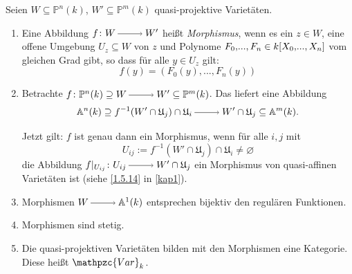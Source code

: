 \documentclass[a4paper,12pt,index=toc]{scrbook}
\theoremstyle{keinenummern} %
\def\A{\mathbb{A}}
\def\P{\mathbb{P}}
\newcommand{\Var}{\mathpzc{Var}}
\def\U{\mathfrak{U}}
\newcommand{\leer}{\ensuremath{\varnothing}}
\newcommand{\restrict}[1]{|_{#1}}
\renewcommand{\dotsc}{\ensuremath{\!...}}
\newcommand{\ppolyx}[1][n]{\ensuremath%
  [X_{0},\dotsc,X_{#1}]}
\begin{document}
\begin{db}\label{2.6.1}
Seien $W\subseteq \P^n(k)$, $W'\subseteq \P^m(k)$ quasi-projektive Varietäten.
  \begin{enumerate}
  \item{} Eine Abbildung $f\colon W\ra W'$ heißt \emph{Morphismus}, wenn es ein $z \in W$, eine offene Umgebung $U_z \subseteq W$ von $z$ und Polynome $F_0,\dotsc,F_n \in k\ppolyx$ vom gleichen Grad gibt, so dass für alle $y \in U_z$ gilt:
\[f(y)=(F_0(y),\dotsc,F_n(y))\]
  \item{} Betrachte $f \colon \P^n(k)\supseteq W \ra W' \subseteq \P^m(k)$. Das liefert eine Abbildung 
  \[\A^n(k)\supseteq f^{-1}(W'\cap \U_j) \cap \U_i \ra W' \cap \U_j\subseteq\A^{m}(k).\] 

Jetzt gilt:
$f$ ist genau dann ein Morphismus, wenn für alle $i,j$ mit 
\[U_{ij}:=f^{-1}(W'\cap \U_j) \cap \U_i \neq \leer\]
 die Abbildung $f\restrict{U_{ij}} \colon U_{ij} \ra W'\cap \U_j$ ein Morphismus von quasi-affinen Varietäten ist (siehe \cref{1.5.14} in \cref{kap1}).
  \item{} Morphismen $W\ra \A^1(k)$ entsprechen bijektiv den regulären Funktionen.
  \item{} Morphismen sind stetig.
  \item{} Die quasi-projektiven Varietäten bilden mit den Morphismen eine Kategorie. Diese heißt $\Var_k$.
  \end{enumerate}
\end{db}
\end{document}
